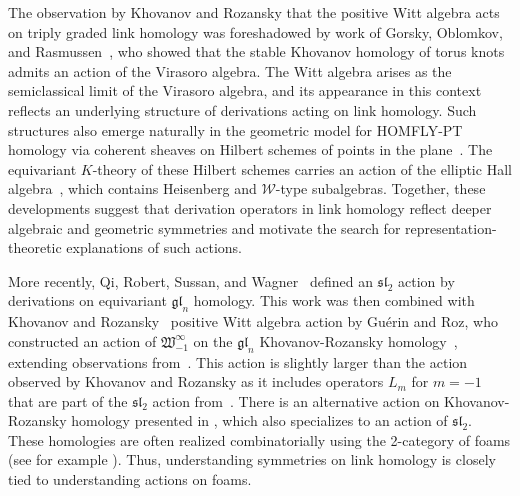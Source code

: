 \documentclass{amsart}
\numberwithin{equation}{section}
\theoremstyle{definition}
\newcommand{\witt}{{\mathfrak{W}}}
\newcommand{\ourwitt}{{\witt_{-1}^{\infty}}}
\begin{document}
The observation by Khovanov and Rozansky that the positive Witt algebra acts on triply graded link homology was foreshadowed by work of Gorsky, Oblomkov, and Rasmussen~\cite{Gorsky2013}, who showed that the stable Khovanov homology of torus knots admits an action of the Virasoro algebra. The Witt algebra arises as the semiclassical limit of the Virasoro algebra, and its appearance in this context reflects an underlying structure of derivations acting on link homology. Such structures also emerge naturally in the geometric model for HOMFLY-PT homology via coherent sheaves on Hilbert schemes of points in the plane~\cite{Oblomkov_2018}. The equivariant $K$-theory of these Hilbert schemes carries an action of the elliptic Hall algebra~\cite{Schiffmann_2013}, which contains Heisenberg and $\mathcal{W}$-type subalgebras. Together, these developments suggest that derivation operators in link homology reflect deeper algebraic and geometric symmetries and motivate the search for representation-theoretic explanations of such actions. 


More recently, Qi, Robert, Sussan, and Wagner~\cite{qi2023symmetriesequivariant} defined an $\mathfrak{sl}_2$ action by derivations on equivariant $\mathfrak{gl}_n$ homology.  This work was then combined with  Khovanov and Rozansky~\cite{khovanov2013positivehalfwittalgebra} positive Witt algebra action by Guérin and Roz, who constructed an action of $\ourwitt$ on the $\mathfrak{gl}_n$ Khovanov-Rozansky homology~\cite{guérin2025actionwittalgebrakhovanovrozansky},   extending observations from~\cite{roz2023mathfraksl2actionlinkhomology}.   This action is slightly larger than the action observed by Khovanov and Rozansky as it includes operators $L_m$ for $m=-1$ that are part of the $\mathfrak{sl}_2$ action from~\cite{qi2023symmetriesequivariant}.  There is an alternative action on Khovanov-Rozansky homology presented in \cite{Gorsky_2014}, which also specializes to an action of $\mathfrak{sl}_2$. These homologies are often realized combinatorially using the 2-category of foams (see for example \cite{Mackaay_2009,QR,Robert2020-xp}). Thus, understanding symmetries on link homology is closely tied to understanding actions on foams.
\end{document}
